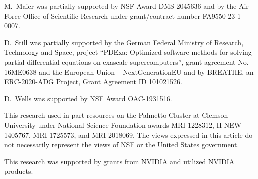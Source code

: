 \documentclass{ansarticle-preprint}
\begin{document}
M.~Maier was partially supported by NSF Award DMS-2045636 and by the
Air Force Office of Scientific Research under grant/contract number
FA9550-23-1-0007.

D.~Still was partially supported by the
German Federal Ministry of Research, Technology and Space, project
``PDExa: Optimized software methods for solving partial differential
equations on exascale supercomputers'', grant agreement No. 16ME0638
and the European Union – NextGenerationEU
and by BREATHE, an ERC-2020-ADG Project, Grant Agreement ID 101021526.

D.~Wells was supported by NSF Award OAC-1931516.

This research used in part resources on the Palmetto Cluster at
Clemson University under National Science Foundation awards MRI
1228312, II NEW 1405767, MRI 1725573, and MRI 2018069. The views
expressed in this article do not necessarily represent the views of NSF or the United States government.

This research was supported by grants from NVIDIA and utilized NVIDIA products.



\end{document}
